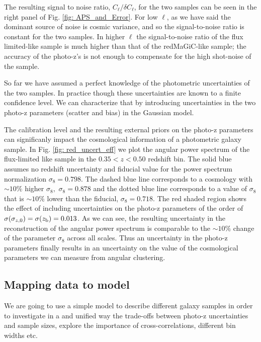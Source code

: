 \documentclass[a4paper,fleqn,usenatbib]{mnras}
\begin{document}
The resulting signal to noise ratio, $C_\ell/\delta C_\ell$,  for the two samples can be seen in the right panel of Fig. \ref{fig: APS_and_Error}. For low $\ell$, as we have said the dominant source of noise is cosmic variance, and so the signal-to-noise ratio is constant for the two samples. In higher $\ell$ the signal-to-noise ratio of the flux limited-like sample is much higher than that of the  redMaGiC-like sample; the accuracy of the photo-z's is not enough to compensate for the high shot-noise of the sample. 

So far we have assumed a perfect knowledge of the photometric uncertainties of the two samples. In practice though these uncertainties are known to a finite confidence level. We can characterize that by introducing uncertainties in the two photo-z parameters (scatter and bias) in the Gaussian model. 

The calibration level and the resulting external priors on the photo-z parameters can significanly impact the cosmological information of a photometric galaxy sample. In Fig. \ref{fig: red_uncert_eff} we plot the angular power spectrum of the flux-limited like sample in the $0.35 < z < 0.50$ redshift bin. The solid blue assumes no redshift uncertainty and fiducial value for the power spectrum normalization $\sigma_8 = 0.798$.  The dashed blue line corresponds to a cosmology with $ \sim 10\%$ higher $\sigma_8 , \,\, \sigma_8 = 0.878$ and the dotted blue line corresponds to a value of $\sigma_8$ that is $\sim 10\%$ lower than the fiducial, $\sigma_8 = 0.718$. The red shaded region shows the effect of including uncertainties on the photo-z parameters of the order of $\sigma(\sigma_{z,0}) = \sigma(z_{\mbox{\scriptsize{b}}}) = 0.013$. As we can see, the resulting uncertainty in the reconstruction of the angular power spectrum is comparable to the $\sim 10\%$ change of the parameter $\sigma_8$ across all scales. Thus an uncertainty in the photo-z parameters finally results  in an uncertainty on the value of the cosmological parameters we can measure from angular clustering.
 




\subsection{Mapping data to model}


We are going to use a simple model to describe different galaxy samples in order to investigate in a and unified way the trade-offs between photo-z uncertainties and sample sizes, explore the importance of cross-correlations, different bin widths etc. 
\end{document}
